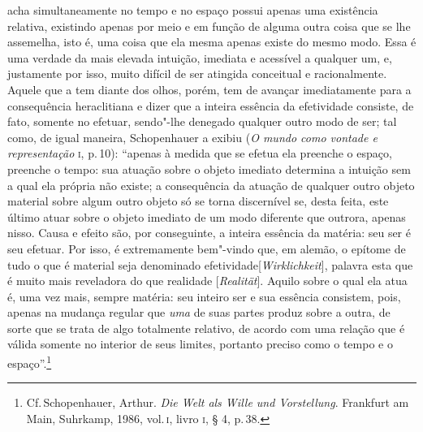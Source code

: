 acha simultaneamente no tempo e no espaço possui apenas uma existência
relativa, existindo apenas por meio e em função de alguma outra coisa que se
lhe assemelha, isto é, uma coisa que ela mesma apenas existe do mesmo modo.
Essa é uma verdade da mais elevada intuição, imediata e acessível a qualquer
um, e, justamente por isso, muito difícil de ser atingida conceitual e
racionalmente. Aquele que a tem diante dos olhos, porém, tem de avançar
imediatamente para a consequência heraclitiana e dizer que a inteira essência
da efetividade consiste, de fato, somente no efetuar, sendo"-lhe denegado
qualquer outro modo de ser; tal como, de igual maneira, Schopenhauer a
exibiu (\textit{O mundo como vontade e representação} \textsc{i}, p.\,10):
``apenas à medida que se efetua ela preenche o espaço, preenche o tempo: sua
atuação sobre o objeto imediato determina a intuição sem a qual ela própria
não existe; a consequência da atuação de qualquer outro objeto material sobre
algum outro objeto só se torna discernível se, desta feita, este último atuar
sobre o objeto imediato de um modo diferente que outrora, apenas nisso. Causa
e efeito são, por conseguinte, a inteira essência da matéria: seu ser é seu
efetuar. Por isso, é extremamente bem"-vindo que, em alemão, o epítome de
tudo o que é material seja denominado efetividade[\textit{Wirklichkeit}], 
palavra esta que é muito mais reveladora do que realidade [\textit{Realität}]. 
Aquilo sobre o qual ela atua é, uma vez mais, sempre
matéria: seu inteiro ser e sua essência consistem, pois, apenas na mudança
regular que \textit{uma} de suas partes produz sobre a outra, de sorte que se
trata de algo totalmente relativo, de acordo com uma relação que é válida
somente no interior de seus limites, portanto preciso como o tempo e o
espaço''.\footnote{Cf.\,Schopenhauer, Arthur. \textit{Die Welt als Wille und
Vorstellung}. Frankfurt am Main, Suhrkamp, 1986, vol.\,\textsc{i}, livro \textsc{i}, 
§ 4, p.\,38.}


